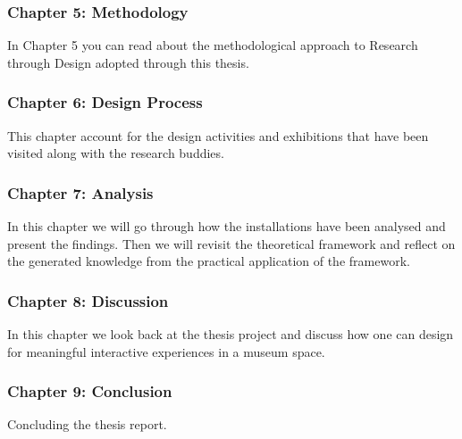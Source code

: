 \subsubsection{Chapter 5: Methodology}
In Chapter 5 you can read about the methodological approach to Research through Design adopted through this thesis. 

\subsubsection{Chapter 6: Design Process}
This chapter account for the design activities and exhibitions that have been visited along with the research buddies.

\subsubsection{Chapter 7: Analysis}
In this chapter we will go through how the installations have been analysed and present the findings. Then we will revisit the theoretical framework and reflect on the generated knowledge from the practical application of the framework.


\subsubsection{Chapter 8: Discussion}
In this chapter we look back at the thesis project and discuss how one can design for meaningful interactive experiences in a museum space.


\subsubsection{Chapter 9: Conclusion}
Concluding the thesis report.